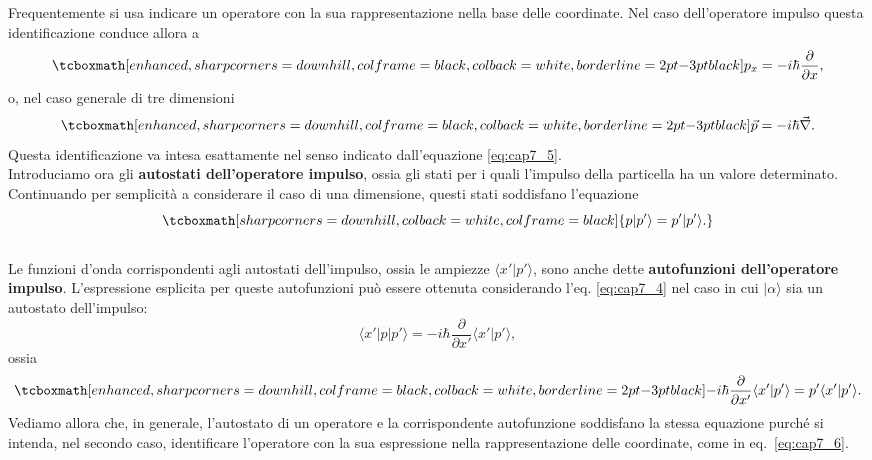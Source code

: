 \documentclass[a4paper,12pt,oneside]{book}
\begin{document}
Frequentemente si usa indicare un operatore con la sua rappresentazione nella base delle coordinate. Nel caso dell'operatore impulso questa identificazione conduce allora a
	\begin{equation}
		\label{eq:cap7_6}
		\tcboxmath[enhanced, sharp corners=downhill, colframe=black, colback=white, borderline={2pt}{-3pt}{black}]{
			p_x= -i\hbar \frac{\partial}{\partial x} ,
			}
	\end{equation}
o, nel caso generale di tre dimensioni
	\begin{equation}
		\tcboxmath[enhanced, sharp corners=downhill, colframe=black, colback=white, borderline={2pt}{-3pt}{black}]{
			\vec{p}= -i\hbar \vec{\nabla}.
			}
	\end{equation}
Questa identificazione va intesa esattamente nel senso indicato dall'equazione \eqref{eq:cap7_5}.\\

Introduciamo ora gli \textbf{autostati dell'operatore impulso}, ossia gli stati per i quali l'impulso della particella ha un valore determinato. Continuando per semplicità a considerare il caso di una dimensione, questi stati soddisfano l'equazione
	\begin{equation}
		\tcboxmath[sharp corners=downhill, colback=white, colframe=black]{
			p | p' \rangle = p' | p' \rangle.
			}
	\end{equation}\\
	
Le funzioni d'onda corrispondenti agli autostati dell'impulso, ossia le ampiezze $\langle x' | p' \rangle$, sono anche dette \textbf{autofunzioni dell'operatore impulso}. L'espressione esplicita per queste autofunzioni può essere ottenuta considerando l'eq. \eqref{eq:cap7_4} nel caso in cui $| \alpha \rangle$ sia un autostato dell'impulso:
	\begin{equation}
		\langle x' | p | p' \rangle = -i \hbar \frac{\partial}{\partial x'} \langle x' | p' \rangle,
	\end{equation}
\noindent ossia
	\begin{equation}
		\label{eq:cap7_7}
		\tcboxmath[enhanced, sharp corners=downhill, colframe=black, colback=white, borderline={2pt}{-3pt}{black}]{
			-i \hbar \frac{\partial}{\partial x'} \langle x' | p' \rangle = p' \langle x' | p' \rangle.
			}
	\end{equation}
Vediamo allora che, in generale, l'autostato di un operatore e la corrispondente autofunzione soddisfano la stessa equazione purché si intenda, nel secondo caso, identificare l'operatore con la sua espressione nella rappresentazione delle coordinate, come in eq.~\eqref{eq:cap7_6}.\\
\end{document}
